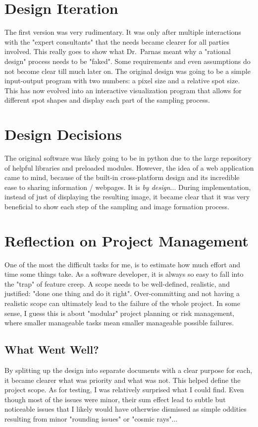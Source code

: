 \documentclass{article}
\begin{document}
\section{Design Iteration}
The first version was very rudimentary. It was only after multiple interactions
with the "expert consultants" that the needs became clearer for all parties involved.
This really goes to show what Dr.~Parnas meant why a "rational design" process
needs to be "faked". Some requirements and even assumptions do not become clear
till much later on. The original design was going to be a simple input-output
program with two numbers: a pixel size and a relative spot size. This has now
evolved into an interactive visualization program that allows for different
spot shapes and display each part of the sampling process.

\section{Design Decisions}
The original software was likely going to be in python due to the large
repository of helpful libraries and preloaded modules.
However, the idea of a web application came to mind, because of the
built-in cross-platform design and its incredible
ease to sharing information / webpages.
It is \textit{by design}...
During implementation, instead of just of displaying the resulting image,
it became clear that it was very beneficial
to show each step of the sampling and image formation process.

\section{Reflection on Project Management}
One of the most the difficult tasks for me, is to estimate how much effort and time
some things take. As a software developer, it is always so easy to fall into the 
"trap" of feature creep. A scope needs to be well-defined, realistic, and justified:
"done one thing and do it right". Over-committing and not having a realistic 
scope can ultimately lead to the failure of the whole project. In some sense,
I guess this is about "modular" project planning or risk management,
where smaller manageable tasks mean smaller manageable possible failures.

\subsection{What Went Well?}
By splitting up the design into separate documents with a clear purpose for each,
it became clearer what was priority and what was not. This helped define the
project scope. As for testing, I was relatively surprised what I could find.
Even though most of the issues were minor, their sum effect lead to subtle
but noticeable issues that I likely would have otherwise dismissed as
simple oddities resulting from minor "rounding issues" or "cosmic rays"...
\end{document}
